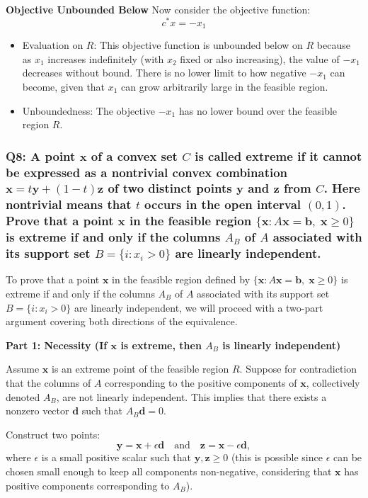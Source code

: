 \documentclass[8pt]{article}
\begin{document}
{\textbf{Objective Unbounded Below}
Now consider the objective function:
\[
c^*x = -x_1
\]
\begin{itemize}
    \item Evaluation on \(R\): This objective function is unbounded below on \(R\) because as \(x_1\) increases indefinitely (with \(x_2\) fixed or also increasing), the value of \(-x_1\) decreases without bound. There is no lower limit to how negative \(-x_1\) can become, given that \(x_1\) can grow arbitrarily large in the feasible region.
    \item Unboundedness: The objective \(-x_1\) has no lower bound over the feasible region \(R\).
\end{itemize}


\subsubsection*{Q8: A point \(\mathbf{x}\) of a convex set \(C\) is called extreme if it cannot be expressed as a nontrivial convex combination \(\mathbf{x} = t\mathbf{y} + (1 - t)\mathbf{z}\) of two distinct points \(\mathbf{y}\) and \(\mathbf{z}\) from \(C\). Here nontrivial means that \(t\) occurs in the open interval \((0, 1)\). Prove that a point \(\mathbf{x}\) in the feasible region \(\{\mathbf{x} : A\mathbf{x} = \mathbf{b}, \; \mathbf{x} \geq 0\}\) is extreme if and only if the columns \(A_B\) of \(A\) associated with its support set \(B = \{i : x_i > 0\}\) are linearly independent.}

To prove that a point \(\mathbf{x}\) in the feasible region defined by \(\{\mathbf{x} : A\mathbf{x} = \mathbf{b}, \; \mathbf{x} \geq 0\}\) is extreme if and only if the columns \(A_B\) of \(A\) associated with its support set \(B = \{i : x_i > 0\}\) are linearly independent, we will proceed with a two-part argument covering both directions of the equivalence.

\textbf{Part 1: Necessity (If \(\mathbf{x}\) is extreme, then \(A_B\) is linearly independent)}

Assume \(\mathbf{x}\) is an extreme point of the feasible region \(R\). Suppose for contradiction that the columns of \(A\) corresponding to the positive components of \(\mathbf{x}\), collectively denoted \(A_B\), are not linearly independent. This implies that there exists a nonzero vector \(\mathbf{d}\) such that \(A_B \mathbf{d} = 0\).

Construct two points:
\[
\mathbf{y} = \mathbf{x} + \epsilon \mathbf{d} \quad \text{and} \quad \mathbf{z} = \mathbf{x} - \epsilon \mathbf{d},
\]
where \(\epsilon\) is a small positive scalar such that \(\mathbf{y}, \mathbf{z} \geq 0\) (this is possible since \(\epsilon\) can be chosen small enough to keep all components non-negative, considering that \(\mathbf{x}\) has positive components corresponding to \(A_B\)).

}
\end{document}
